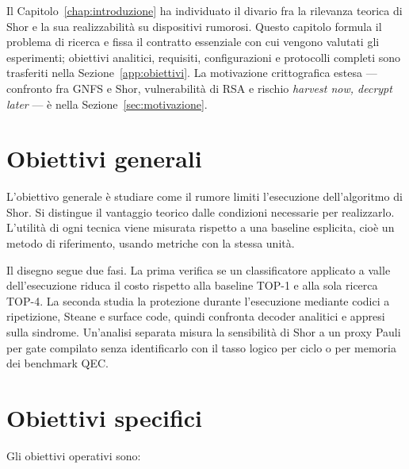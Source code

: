 \begin{onehalfspace}

Il Capitolo~\ref{chap:introduzione} ha individuato il divario fra la rilevanza teorica di Shor e la sua realizzabilità su dispositivi rumorosi. Questo capitolo formula il problema di ricerca e fissa il contratto essenziale con cui vengono valutati gli esperimenti; obiettivi analitici, requisiti, configurazioni e protocolli completi sono trasferiti nella Sezione~\ref{app:obiettivi}. La motivazione crittografica estesa --- confronto fra \ac{GNFS} e Shor, vulnerabilità di \ac{RSA} e rischio \emph{harvest now, decrypt later} --- è nella Sezione~\ref{sec:motivazione}.

\section{Obiettivi generali}

L'obiettivo generale è studiare come il rumore limiti l'esecuzione dell'algoritmo di Shor. Si distingue il vantaggio teorico dalle condizioni necessarie per realizzarlo. L'utilità di ogni tecnica viene misurata rispetto a una baseline esplicita, cioè un metodo di riferimento, usando metriche con la stessa unità.

Il disegno segue due fasi. La prima verifica se un classificatore applicato a valle dell'esecuzione riduca il costo rispetto alla baseline TOP-1 e alla sola ricerca TOP-4. La seconda studia la protezione durante l'esecuzione mediante codici a ripetizione, Steane e surface code, quindi confronta decoder analitici e appresi sulla sindrome. Un'analisi separata misura la sensibilità di Shor a un proxy Pauli per gate compilato senza identificarlo con il tasso logico per ciclo o per memoria dei benchmark \ac{QEC}.

\section{Obiettivi specifici}

Gli obiettivi operativi sono:


\end{onehalfspace}
